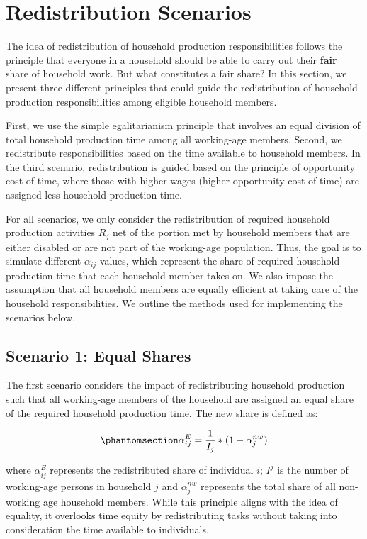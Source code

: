 \documentclass[
  11pt,
]{article}
\begin{document}
\section{Redistribution Scenarios}\label{redistribution-scenarios}

The idea of redistribution of household production responsibilities
follows the principle that everyone in a household should be able to
carry out their \textbf{fair} share of household work. But what
constitutes a fair share? In this section, we present three different
principles that could guide the redistribution of household production
responsibilities among eligible household members.

First, we use the simple egalitarianism principle that involves an equal
division of total household production time among all working-age
members. Second, we redistribute responsibilities based on the time
available to household members. In the third scenario, redistribution is
guided based on the principle of opportunity cost of time, where those
with higher wages (higher opportunity cost of time) are assigned less
household production time.

For all scenarios, we only consider the redistribution of required
household production activities \(R_j\) net of the portion met by
household members that are either disabled or are not part of the
working-age population. Thus, the goal is to simulate different
\(\alpha_{ij}\) values, which represent the share of required household
production time that each household member takes on. We also impose the
assumption that all household members are equally efficient at taking
care of the household responsibilities. We outline the methods used for
implementing the scenarios below.

\subsection{Scenario 1: Equal Shares}\label{scenario-1-equal-shares}

The first scenario considers the impact of redistributing household
production such that all working-age members of the household are
assigned an equal share of the required household production time. The
new share is defined as:

\begin{equation}\phantomsection\label{eq-r1}{\alpha_{ij}^E= \frac{1}{I_j}*(1-\alpha_{j}^{nw})
}\end{equation}

where \(\alpha_{ij}^E\) represents the redistributed share of individual
\(i\); \(I^j\) is the number of working-age persons in household \(j\)
and \(\alpha_{j}^{nw}\) represents the total share of all non-working
age household members. While this principle aligns with the idea of
equality, it overlooks time equity by redistributing tasks without
taking into consideration the time available to individuals.
\end{document}
